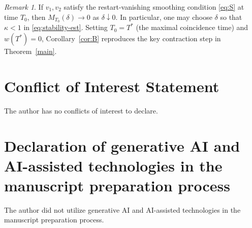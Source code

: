 \documentclass[12pt]{article}
\theoremstyle{remark}
\newtheorem{remark}[theorem]{Remark}
\theoremstyle{remark}
\begin{document}
\begin{remark}
If $v_1,v_2$ satisfy the restart-vanishing smoothing condition \eqref{eq:S} at time $T_0$,
then $M_{T_0}(\delta)\to 0$ as $\delta\downarrow 0$. In particular, one may choose $\delta$
so that $\kappa<1$ in \eqref{eq:stability-est}. Setting $T_0=T^*$ (the maximal coincidence time)
and $w(T^*)=0$, Corollary~\ref{cor:B} reproduces the key contraction step in
Theorem~\ref{main}.
\end{remark}

\section{Conflict of Interest Statement}
The author has no conflicts of interest to declare.

\section{Declaration of generative AI and AI-assisted technologies in the manuscript preparation process}
The author did not utilize generative AI and AI-assisted technologies in the manuscript preparation process.
\end{document}
